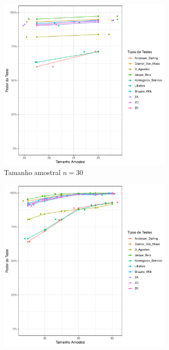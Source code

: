 \documentclass[a4paper,11pt]{article} %
\begin{document}
\begin{figure}[H]
    \centering
    \caption{Comparação do Poder do Teste dos testes AD, CM, DG, LL, JB, KS, ZA, ZC e ZK em função do tamanho amostral para a \textbf{Distribuição} \(\textbf{Cauchy}(0, 1)\).}
    \label{fig:poder_teste_dist_cauchy}
    
    \begin{subfigure}[b]{0.45\textwidth}
        \centering
        \includegraphics[width=0.95\textwidth]{Distribuição Cauchy/Poder do Teste/poder_teste_cauchy_30.pdf}
        \caption{Tamanho amostral \(n = 30\)}
        \label{fig:cauchy_poder_30}
    \end{subfigure}
    \hfill
    \begin{subfigure}[b]{0.45\textwidth}
        \centering
        \includegraphics[width=0.95\textwidth]{Distribuição Cauchy/Poder do Teste/poder_teste_cauchy_50.pdf}

\end{subfigure}
\end{figure}
\end{document}
